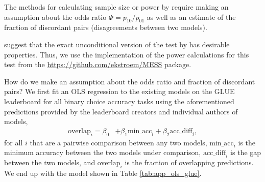 \documentclass[11pt,a4paper]{article}
\begin{document}
The methods for calculating sample size or power by \citet{connett1987sample,schlesselman1982case,suissa19912} require making an assumption about the odds ratio $\Phi = p_{10}/p_{01}$ as well as an estimate of the fraction of discordant pairs (disagreements between two models).


\citet{fagerland2013mcnemar} suggest that the exact unconditional version of the test by \citet{suissa19912} has desirable properties.
Thus, we use the implementation of the power calculations for this test from the \url{https://github.com/ekstroem/MESS} package. 

How do we make an assumption about the odds ratio and fraction of discordant pairs? We first fit an OLS regression to the existing models on the GLUE leaderboard for all binary choice accuracy tasks using the aforementioned predictions provided by the leaderboard creators and individual authors of models,
\begin{equation}
\begin{split}
    \text{overlap}_i = \beta_0 &+ \beta_1 \text{min\_acc}_i + \beta_2 \text{acc\_diff}_i,
\end{split}
\end{equation}
for all $i$ that are a pairwise comparison between any two models, $\text{min\_acc}_i$ is the minimum accuracy between the two models under comparison, $\text{acc\_diff}_i$ is the gap between the two models, and $\text{overlap}_i$ is the fraction of overlapping predictions. We end up with the model shown in Table \ref{tab:app_ols_glue}.
\end{document}
